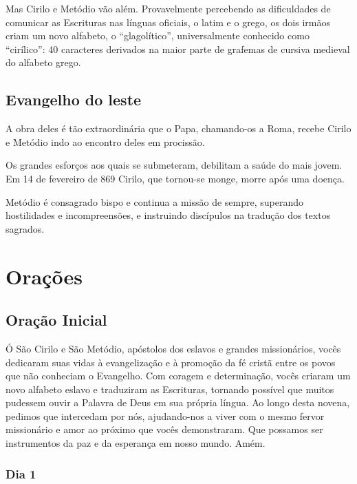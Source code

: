 \documentclass[a4paper,14pt]{extarticle} \usepackage[utf8]{inputenc}
\begin{document}
Mas Cirilo e Metódio vão além. Provavelmente percebendo as dificuldades de comunicar as Escrituras nas línguas oficiais, o latim e o grego, os dois irmãos criam um novo alfabeto, o “glagolítico”, universalmente conhecido como “cirílico”: 40 caracteres derivados na maior parte de grafemas de cursiva medieval do alfabeto grego.

\subsection{Evangelho do leste}

A obra deles é tão extraordinária que o Papa, chamando-os a Roma, recebe Cirilo e Metódio indo ao encontro deles em procissão.

Os grandes esforços aos quais se submeteram, debilitam a saúde do mais jovem. Em 14 de fevereiro de 869 Cirilo, que tornou-se monge, morre após uma doença.

Metódio é consagrado bispo e continua a missão de sempre, superando hostilidades e incompreensões, e instruindo discípulos na tradução dos textos sagrados.

\newpage


\vfill

\section{Orações}
\subsection{Oração Inicial}\label{sub:inicial} %

Ó São Cirilo e São Metódio, apóstolos dos eslavos e grandes missionários, vocês dedicaram suas vidas à evangelização e à promoção da fé cristã entre os povos que não conheciam o Evangelho. Com coragem e determinação, vocês criaram um novo alfabeto eslavo e traduziram as Escrituras, tornando possível que muitos pudessem ouvir a Palavra de Deus em sua própria língua. Ao longo desta novena, pedimos que intercedam por nós, ajudando-nos a viver com o mesmo fervor missionário e amor ao próximo que vocês demonstraram. Que possamos ser instrumentos da paz e da esperança em nosso mundo. Amém.


\subsubsection{Dia 1}
\underline{}
\end{document}
